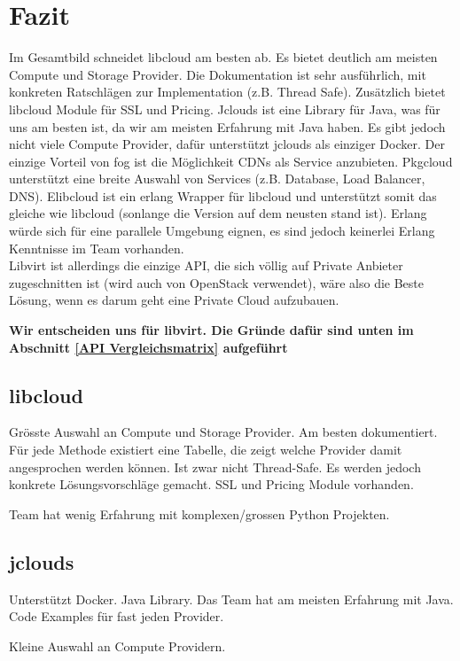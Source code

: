 \newpage

\section{Fazit}

Im Gesamtbild schneidet libcloud am besten ab. Es bietet deutlich am meisten Compute und 
Storage Provider. Die Dokumentation ist sehr ausführlich, mit konkreten Ratschlägen zur 
Implementation (z.B. Thread Safe). Zusätzlich bietet libcloud Module für SSL und Pricing.
Jclouds ist eine Library für Java, was für uns am besten ist, da wir am meisten Erfahrung mit 
Java haben. Es gibt jedoch nicht viele Compute Provider, dafür unterstützt jclouds als einziger Docker.
Der einzige Vorteil von fog ist die Möglichkeit CDNs als Service anzubieten.
Pkgcloud unterstützt eine breite Auswahl von Services (z.B. Database, Load Balancer, DNS).
Elibcloud ist ein erlang Wrapper für libcloud und unterstützt somit das gleiche wie libcloud 
(sonlange die Version auf dem neusten stand ist). Erlang würde sich für eine parallele Umgebung eignen, 
es sind jedoch keinerlei Erlang Kenntnisse im Team vorhanden.\\
Libvirt ist allerdings die einzige API, die sich völlig auf Private Anbieter 
zugeschnitten ist (wird auch von OpenStack verwendet), wäre also die Beste 
Lösung, wenn es darum geht eine Private Cloud aufzubauen.

\textbf{Wir entscheiden uns für libvirt. Die Gründe dafür sind unten im Abschnitt \ref{API Vergleichsmatrix} aufgeführt}


\subsection{libcloud}
\begin{Argumentation}
\pro Grösste Auswahl an Compute und Storage Provider.
\pro Am besten dokumentiert. Für jede Methode existiert eine Tabelle, die zeigt welche Provider damit angesprochen werden können.
\pro Ist zwar nicht Thread-Safe. Es werden jedoch konkrete Lösungsvorschläge gemacht.
\pro SSL und Pricing Module vorhanden.

\contra Team hat wenig Erfahrung mit komplexen/grossen Python Projekten.
\end{Argumentation}

\subsection{jclouds}
\begin{Argumentation}
\pro Unterstützt Docker.
\pro Java Library. Das Team hat am meisten Erfahrung mit Java.
\pro Code Examples für fast jeden Provider.

\contra Kleine Auswahl an Compute Providern.
\end{Argumentation}

